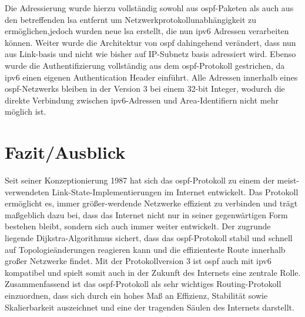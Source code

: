 \documentclass[11pt,a4paper,final]{article}
\begin{document}
Die Adressierung wurde hierzu vollständig sowohl aus \ac{ospf}-Paketen als auch aus den betreffenden \ac{lsa} entfernt um Netzwerkprotokollunabhängigkeit  zu ermöglichen,jedoch wurden neue \ac{lsa} erstellt, die nun \ac{ipv6} Adressen verarbeiten können. Weiter wurde die Architektur von \ac{ospf} dahingehend verändert, dass nun aus Link-basis und nicht wie bisher auf IP-Subnetz basis adressiert wird. Ebenso wurde die Authentifizierung vollständig aus dem \ac{ospf}-Protokoll gestrichen, da \ac{ipv6} einen eigenen Authentication Header einführt. Alle Adressen innerhalb eines \ac{ospf}-Netzwerks bleiben in der Version 3 bei einem 32-bit Integer, wodurch die direkte Verbindung zwischen \ac{ipv6}-Adressen und Area-Identifiern nicht mehr möglich ist. \citep{ospfv3}
\newpage
\section{Fazit/Ausblick}
Seit seiner Konzeptionierung 1987 hat sich das \ac{ospf}-Protokoll zu einem der meist-verwendeten Link-State-Implementierungen im Internet entwickelt. Das Protokoll ermöglicht es, immer größer-werdende Netzwerke effizient zu verbinden und trägt maßgeblich dazu bei, dass das Internet nicht nur in seiner gegenwärtigen Form bestehen bleibt, sondern sich auch immer weiter entwickelt. Der zugrunde liegende Dijkstra-Algorithmus sichert, dass das \ac{ospf}-Protokoll stabil und schnell auf Topologieänderungen reagieren kann und die effizienteste Route innerhalb großer Netzwerke findet. Mit der Protokollversion 3 ist \ac{ospf} auch mit \ac{ipv6} kompatibel und spielt somit auch in der Zukunft des Internets eine zentrale Rolle. \\
Zusammenfassend ist das \ac{ospf}-Protokoll als sehr wichtiges Routing-Protokoll einzuordnen, dass sich durch ein hohes Maß an Effizienz, Stabilität sowie Skalierbarkeit auszeichnet und eine der tragenden Säulen des Internets darstellt.

\clearpage


\end{document}
